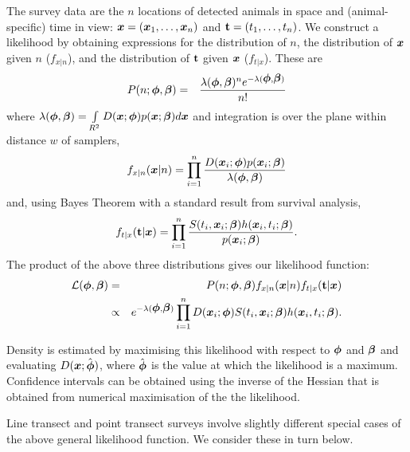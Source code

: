 \documentclass[useAMS,usenatbib,referee]{biom}
\begin{document}
The survey data are the $n$ locations of detected animals in space and (animal-specific) time in view: ${\mbox{\boldmath $x$}}=({\mbox{\boldmath $x$}}_1,\ldots,{\mbox{\boldmath $x$}}_{n})$ and ${\bf t}=(t_1,\ldots,t_{n})$.  We construct a likelihood by obtaining expressions for the distribution of $n$, the distribution of ${\mbox{\boldmath $x$}}$ given $n$ ($f_{x|n}$), and the distribution of ${\bf t}$ given ${\mbox{\boldmath $x$}}$ ($f_{t|x}$). These are
\begin{eqnarray}
P(n;{\mbox{\boldmath $\phi$}},{\mbox{\boldmath $\beta$}})&=&\frac{\lambda({\mbox{\boldmath $\phi$}},{\mbox{\boldmath $\beta$}})^ne^{- \lambda({\mbox{\boldmath $\phi$}},{\mbox{\boldmath $\beta$}})}}{n!}
\end{eqnarray}
\noindent
where $\lambda({\mbox{\boldmath $\phi$}},{\mbox{\boldmath $\beta$}})=\int\limits_{R^2} D({\mbox{\boldmath $x$}};{\mbox{\boldmath $\phi$}})p({\mbox{\boldmath $x$}};{\mbox{\boldmath $\beta$}})d {\mbox{\boldmath $x$}}$ and integration is over the plane within distance $w$ of samplers, 
\begin{eqnarray}
f_{x|n}({\mbox{\boldmath $x$}}|n)=\prod^{n}_{i=1} \frac{D({\mbox{\boldmath $x$}}_i;{\mbox{\boldmath $\phi$}})p({\mbox{\boldmath $x$}}_i;{\mbox{\boldmath $\beta$}})}{\lambda({\mbox{\boldmath $\phi$}},{\mbox{\boldmath $\beta$}})}
\end{eqnarray}
\noindent
and, using Bayes Theorem with a standard result from survival analysis,
\begin{eqnarray}
f_{t|x}({\bf t}|{\mbox{\boldmath $x$}})=\prod^{n}_{i=1}\frac{S(t_i,{\mbox{\boldmath $x$}}_i;{\mbox{\boldmath $\beta$}})h({\mbox{\boldmath $x$}}_i,t_i;{\mbox{\boldmath $\beta$}})}{p({\mbox{\boldmath $x$}}_i;{\mbox{\boldmath $\beta$}})}.
\end{eqnarray}
\noindent
The product of the above three distributions gives our likelihood function:
\begin{eqnarray}
\mathcal{L}({\bmt{\phi}},{\bmt{\beta}})
&=&P(n;{\bmt{\phi}},{\bmt{\beta}})f_{x|n}({\bmt{x}}|n)f_{t|x}({\bf t}|{\bmt{x}}) 
\label{eq:full.lik} \\
&\propto& e^{-\lambda({\bmt{\phi}},{\bmt{\beta}})}\prod^{n}_{i=1}D({\bmt{x}}_i;{\bmt{\phi}})S(t_i,{\bmt{x}}_i;{\bmt{\beta}})h({\bmt{x}}_i,t_i;{\bmt{\beta}}).
\end{eqnarray}

Density is estimated by maximising this likelihood with respect to ${\mbox{\boldmath $\phi$}}$ and ${\mbox{\boldmath $\beta$}}$ and evaluating $D({\mbox{\boldmath $x$}};\hat{\mbox{\boldmath $\phi$}})$, where $\hat{\mbox{\boldmath $\phi$}}$ is the value at which the likelihood is a maximum. Confidence intervals can be obtained using the inverse of the Hessian that is obtained from numerical maximisation of the the likelihood. 

Line transect and point transect surveys involve slightly different special cases of the above general likelihood function. We consider these in turn below.
\end{document}
